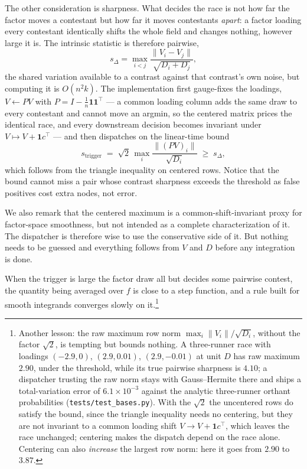 \documentclass[11pt]{article}
\begin{document}
The other consideration is sharpness. What decides the race is not how
far the factor moves a contestant but how far it moves contestants
\emph{apart}: a factor loading every contestant identically shifts the
whole field and changes nothing, however large it is. The intrinsic
statistic is therefore pairwise,
\[
s_{\Delta}=\max_{i<j}\frac{\lVert V_i-V_j\rVert}{\sqrt{D_i+D_j}},
\]
the shared variation available to a contrast against that contrast's own
noise, but computing it is $O(n^2 k)$. The implementation first
gauge-fixes the loadings, $V\leftarrow PV$ with
$P=I-\tfrac1n\mathbf{1}\mathbf{1}^{\top}$ --- a common loading column
adds the same draw to every contestant and cannot move an argmin, so the
centered matrix prices the identical race, and every downstream decision
becomes invariant under $V\mapsto V+\mathbf{1}c^{\top}$ --- and then
dispatches on the linear-time bound
\[
s_{\mathrm{trigger}}\;=\;\sqrt2\,
\max_i \frac{\lVert (PV)_i\rVert}{\sqrt{D_i}}\;\ge\;s_{\Delta},
\]
which follows from the triangle inequality on centered rows. Notice that the bound cannot miss a pair whose contrast sharpness exceeds the threshold as false positives cost extra nodes, not error.

We also remark that the centered maximum is a
common-shift-invariant proxy for factor-space smoothness, but not intended as a complete
characterization of it. The dispatcher is therefore wise to use the
conservative side of it. But nothing needs to be guessed and everything follows
from $V$ and $D$ before any integration is done.

When the trigger is large the factor draw all but decides some pairwise contest, the
quantity being averaged over $f$ is close to a step function, and a rule
built for smooth integrands converges slowly on it.\footnote{Another lesson: the raw
maximum row norm $\max_i\lVert V_i\rVert/\sqrt{D_i}$, without the factor
$\sqrt2$, is tempting but bounds nothing. A three-runner race with loadings
$(-2.9,0)$, $(2.9,0.01)$, $(2.9,-0.01)$ at unit $D$ has raw
maximum $2.90$, under the threshold, while its true pairwise sharpness
is $4.10$; a dispatcher trusting the raw norm stays with Gauss--Hermite
there and ships a total-variation error of $6.1\times10^{-3}$ against
the analytic three-runner orthant probabilities
(\texttt{tests/test\_bases.py}). With the $\sqrt2$ the uncentered rows do
satisfy the bound, since the triangle inequality needs no centering, but
they are not invariant to a common loading shift $V\to V+\mathbf{1}c^{\top}$,
which leaves the race unchanged; centering makes the dispatch depend on
the race alone. Centering can also \emph{increase} the largest row norm:
here it goes from $2.90$ to $3.87$.}
\end{document}
